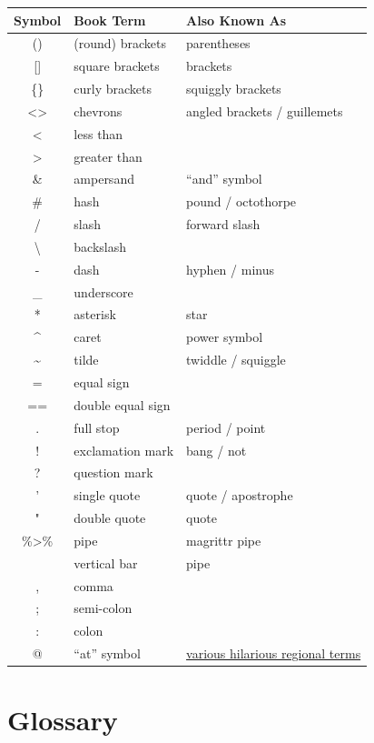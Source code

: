 \documentclass[
]{book}
\begin{document}
\begin{longtable}[]{@{}cll@{}}
\toprule
Symbol & Book Term & Also Known As \\
\midrule
\endhead
() & (round) brackets & parentheses \\
{[}{]} & square brackets & brackets \\
\{\} & curly brackets & squiggly brackets \\
\textless\textgreater{} & chevrons & angled brackets / guillemets \\
\textless{} & less than & \\
\textgreater{} & greater than & \\
\& & ampersand & ``and'' symbol \\
\# & hash & pound / octothorpe \\
/ & slash & forward slash \\
\textbackslash{} & backslash & \\
- & dash & hyphen / minus \\
\_ & underscore & \\
* & asterisk & star \\
\^{} & caret & power symbol \\
\textasciitilde{} & tilde & twiddle / squiggle \\
= & equal sign & \\
== & double equal sign & \\
. & full stop & period / point \\
! & exclamation mark & bang / not \\
? & question mark & \\
' & single quote & quote / apostrophe \\
" & double quote & quote \\
\%\textgreater\% & pipe & magrittr pipe \\
\textbar{} & vertical bar & pipe \\
, & comma & \\
; & semi-colon & \\
: & colon & \\
@ & ``at'' symbol & \href{https://www.theguardian.com/notesandqueries/query/0,5753,-1773,00.html}{various hilarious regional terms} \\
\bottomrule
\end{longtable}

\hypertarget{glossary}{%
\chapter{Glossary}\label{glossary}}
\end{document}
